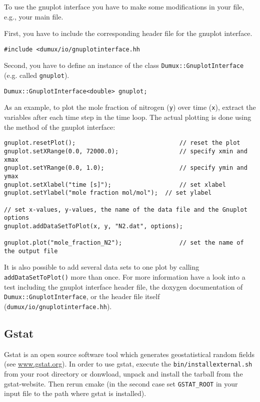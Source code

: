 To use the gnuplot interface you have to make some modifications in your file, e.g., your main file.

First, you have to include the corresponding header file for the gnuplot interface.
\begin{lstlisting}[style=DumuxCode]
#include <dumux/io/gnuplotinterface.hh
\end{lstlisting}

Second, you have to define an instance of the class \texttt{Dumux::GnuplotInterface} (e.g. called \texttt{gnuplot}).
\begin{lstlisting}[style=DumuxCode]
Dumux::GnuplotInterface<double> gnuplot;
\end{lstlisting}

As an example, to plot the mole fraction of nitrogen (\texttt{y}) over time (\texttt{x}),
extract the variables after each time step in the time loop.
The actual plotting is done using the method of the gnuplot interface:

\begin{lstlisting}[style=DumuxCode]
gnuplot.resetPlot();                             // reset the plot
gnuplot.setXRange(0.0, 72000.0);                 // specify xmin and xmax
gnuplot.setYRange(0.0, 1.0);                     // specify ymin and ymax
gnuplot.setXlabel("time [s]");                   // set xlabel
gnuplot.setYlabel("mole fraction mol/mol");  // set ylabel

// set x-values, y-values, the name of the data file and the Gnuplot options
gnuplot.addDataSetToPlot(x, y, "N2.dat", options);

gnuplot.plot("mole_fraction_N2");                // set the name of the output file
\end{lstlisting}

It is also possible to add several data sets to one plot by calling \texttt{addDataSetToPlot()} more than once.
For more information have a look into a test including the gnuplot interface header file, the doxygen documentation
of \texttt{Dumux::GnuplotInterface}, or the header file itself (\texttt{dumux/io/gnuplotinterface.hh}).


\subsection{Gstat}
Gstat is an open source software tool which generates geostatistical random fields (see \url{www.gstat.org}).
In order to use gstat, execute the \texttt{bin/installexternal.sh} from your \Dumux root
directory or donwload, unpack and install the tarball from the gstat-website.
Then rerun cmake (in the second case set \texttt{GSTAT\_ROOT} in your input file to the
path where gstat is installed).


